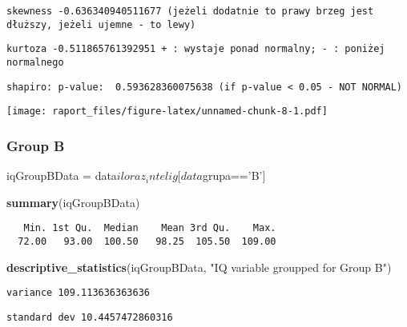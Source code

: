 \documentclass[]{article}
\newenvironment{Shaded}{\begin{snugshade}}{\end{snugshade}}
\newcommand{\KeywordTok}[1]{\textcolor[rgb]{0.13,0.29,0.53}{\textbf{{#1}}}}
\newcommand{\StringTok}[1]{\textcolor[rgb]{0.31,0.60,0.02}{{#1}}}
\newcommand{\NormalTok}[1]{{#1}}
\begin{document}
\begin{verbatim}
skewness -0.636340940511677 (jeżeli dodatnie to prawy brzeg jest dłuższy, jeżeli ujemne - to lewy)
\end{verbatim}

\begin{verbatim}
kurtoza -0.511865761392951 + : wystaje ponad normalny; - : poniżej normalnego
\end{verbatim}

\begin{verbatim}
shapiro: p-value:  0.593628360075638 (if p-value < 0.05 - NOT NORMAL)
\end{verbatim}

\texttt{[image: raport\_files/figure-latex/unnamed-chunk-8-1.pdf]}

\subsubsection{Group B}\label{group-b}

\begin{Shaded}
\begin{Highlighting}[]
\NormalTok{iqGroupBData =}\StringTok{ }\NormalTok{data$iloraz_intelig[data$grupa==}\StringTok{'B'}\NormalTok{]}
\end{Highlighting}
\end{Shaded}

\begin{Shaded}
\begin{Highlighting}[]
\KeywordTok{summary}\NormalTok{(iqGroupBData)}
\end{Highlighting}
\end{Shaded}

\begin{verbatim}
   Min. 1st Qu.  Median    Mean 3rd Qu.    Max. 
  72.00   93.00  100.50   98.25  105.50  109.00 
\end{verbatim}

\begin{Shaded}
\begin{Highlighting}[]
\KeywordTok{descriptive_statistics}\NormalTok{(iqGroupBData, }\StringTok{"IQ variable groupped for Group B"}\NormalTok{)}
\end{Highlighting}
\end{Shaded}

\begin{verbatim}
variance 109.113636363636
\end{verbatim}

\begin{verbatim}
standard dev 10.4457472860316
\end{verbatim}
\end{document}
